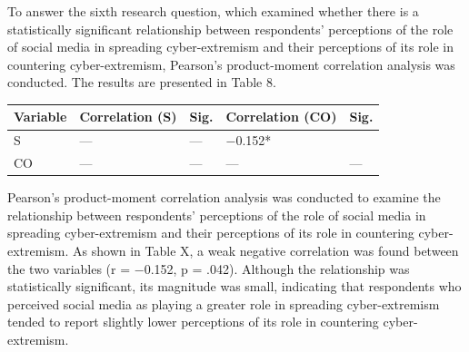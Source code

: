 \documentclass[10pt]{NSP1}
\makeatletter
\newcommand\jltx@wideopen{\par\addvspace{\medskipamount}\noindent}
\newcommand\jltx@wideclose{\par\addvspace{\medskipamount}}
\newenvironment{jltxspan}
  {\if@twocolumn\let\jltx@spannext\strip\else\let\jltx@spannext\jltx@wideopen\fi\jltx@spannext}
  {\if@twocolumn\let\jltx@spanend\endstrip\else\let\jltx@spanend\jltx@wideclose\fi\jltx@spanend}
\newcommand\JLTXaboveplacement{\par\addvspace{6pt plus 2pt minus 2pt}\noindent}
\newcommand\JLTXbelowplacement{\par\addvspace{6pt plus 2pt minus 2pt}}
\makeatother
\begin{document}
\par\medskip{}\smallskip

To answer the sixth research question, which examined whether there is a statistically significant relationship between respondents' perceptions of the role of social media in spreading cyber-extremism and their perceptions of its role in countering cyber-extremism, Pearson's product-moment correlation analysis was conducted. The results are presented in Table 8.

\JLTXaboveplacement \begin{jltxspan}%
\noindent\begin{minipage}{\linewidth}%
\centering
{\small
\begin{tabular}{|>{\raggedright\arraybackslash}p{}|>{\raggedright\arraybackslash}p{}|>{\raggedright\arraybackslash}p{}|>{\raggedright\arraybackslash}p{}|>{\raggedright\arraybackslash}p{}|}
\hline
\cellcolor[HTML]{DDD9C3}\textbf{Variable} & \cellcolor[HTML]{DDD9C3}\textbf{Correlation (S)} & \cellcolor[HTML]{DDD9C3}\textbf{Sig.} & \cellcolor[HTML]{DDD9C3}\textbf{Correlation (CO)} & \cellcolor[HTML]{DDD9C3}\textbf{Sig.} \\
\hline
\cellcolor[HTML]{DDD9C3}S & — & — & −0.152* & 0.042 \\
\hline
\cellcolor[HTML]{DDD9C3}CO & — & — & — & — \\
\hline
\end{tabular}}
%
\end{minipage}%
\end{jltxspan}\JLTXbelowplacement 

\par\medskip{}\smallskip

Pearson's product-moment correlation analysis was conducted to examine the relationship between respondents' perceptions of the role of social media in spreading cyber-extremism and their perceptions of its role in countering cyber-extremism. As shown in Table X, a weak negative correlation was found between the two variables (r = −0.152, p = .042). Although the relationship was statistically significant, its magnitude was small, indicating that respondents who perceived social media as playing a greater role in spreading cyber-extremism tended to report slightly lower perceptions of its role in countering cyber-extremism.
\end{document}
